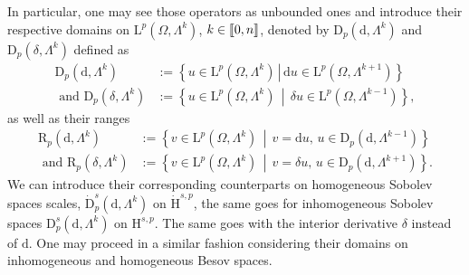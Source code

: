 \documentclass[10pt]{amsart}
\theoremstyle{definition}\newtheorem{defi}[theo]{Definition}\newtheorem{rema}[theo]{Remark}\newtheorem{exam}[theo]{Example}\newtheorem{exem}[theo]{Example}\newtheorem{nota}[theo]{Notation}
\newcommand{\rmH}{\mathrm{H}}%
\newcommand{\rmd}{\mathrm{d}}
\newcommand{\rmD}{\mathrm{D}}
\newcommand{\rmL}{\mathrm{L}}
\newcommand{\rmR}{\mathrm{R}}
\newcommand{\llbracket}{\mathopen{[\mkern -2.7mu[}}
\newcommand{\rrbracket}{\mathclose{]\mkern -2.7mu]}}
\newcommand{\llb}{\llbracket}
\newcommand{\rrb}{\rrbracket}
\begin{document}
\pagebreak
In particular, one may see those operators as unbounded ones and introduce their respective domains on $\rmL^p(\Omega, \Lambda^{k})$, $k\in\llb 0,n\rrb$, denoted by $\rmD_p(\rmd,\Lambda^k)$ and $\rmD_p({\delta},\Lambda^k)$ defined as
\begin{align*}
\rmD_{p}\left(\rmd,\Lambda^k\right)&:=\left\{u \in \rmL^p\left(\Omega,\Lambda^k\right) \,\left|\, \rmd u \in \rmL^p\left(\Omega,\Lambda^{k+1}\right)\right.\right\}\\
\text { and } \rmD_{p}\left({\delta},\Lambda^k\right)&:=\left\{u \in \rmL^p\left(\Omega, \Lambda^k\right)\,\middle|\, {\delta} u \in \rmL^p\left(\Omega, \Lambda^{k-1}\right)\right\},
\end{align*}
as well as their ranges
\begin{align*}
\rmR _{p}\left(\rmd,\Lambda^k\right)&:=\left\{v \in \rmL^p\left(\Omega,\Lambda^k\right) \,\middle|\, v=\rmd u,\, u\in \rmD_{p}\left(\rmd,\Lambda^{k-1}\right)\right\}\\
\text { and } \rmR _{p}\left({\delta},\Lambda^k\right)&:=\left\{ v \in \rmL^p\left(\Omega,\Lambda^k\right) \,\middle|\,v=\delta u,\, u\in \rmD_{p}\left(\rmd,\Lambda^{k+1}\right)\right\}.
\end{align*}
We can introduce their corresponding counterparts on homogeneous Sobolev spaces scales, $\dot{\rmD}^{s}_{p}(\rmd,\Lambda^k)$ on $\dot{\rmH}^{s,p}$, the same goes for inhomogeneous Sobolev spaces ${\rmD}^{s}_{p}(\rmd,\Lambda^k)$ on ${\rmH}^{s,p}$. The same goes with the interior derivative ${\delta}$ instead of $\rmd$. One may proceed in a similar fashion considering their domains on inhomogeneous and homogeneous Besov spaces.
\end{document}
